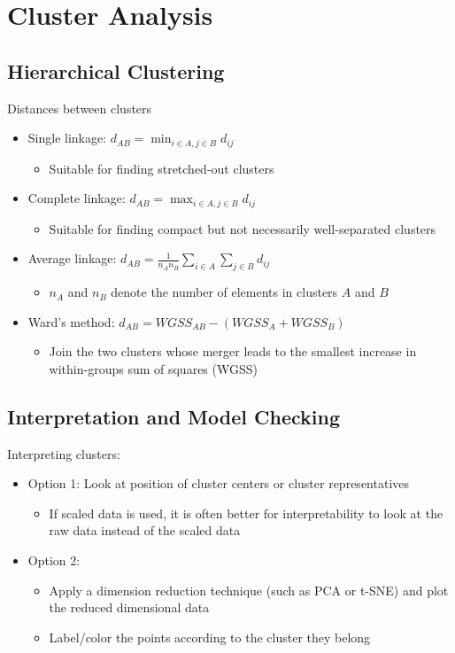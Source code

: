 \documentclass[a4paper]{article}
\begin{document}
\section{Cluster Analysis}

\subsection{Hierarchical Clustering}

Distances between clusters
\begin{itemize}
    \item Single linkage: $d_{AB}=\min_{i\in A, j\in B} d_{ij}$
    \begin{itemize}
        \item Suitable for finding stretched-out clusters
    \end{itemize}
    \item Complete linkage: $d_{AB}=\max_{i\in A, j\in B} d_{ij}$
    \begin{itemize}
        \item Suitable for finding compact but not necessarily well-separated clusters
    \end{itemize}
    \item Average linkage: $d_{AB}=\frac{1}{n_An_B}\sum_{i\in A}\sum_{j\in B}d_{ij}$
    \begin{itemize}
        \item $n_A$ and $n_B$ denote the number of elements in clusters $A$ and $B$
    \end{itemize}
    \item Ward's method: $d_{AB}=WGSS_{AB}-(WGSS_{A}+WGSS_{B})$
    \begin{itemize}
        \item Join the two clusters whose merger leads to the smallest increase in within-groups sum of squares (WGSS)
    \end{itemize}
\end{itemize}

\subsection{Interpretation and Model Checking}

Interpreting clusters:
\begin{itemize}
    \item Option 1: Look at position of cluster centers or cluster representatives
    \begin{itemize}
        \item If scaled data is used, it is often better for interpretability to look at the raw data instead of the scaled data
    \end{itemize}
    \item Option 2: 
    \begin{itemize}
        \item Apply a dimension reduction technique (such as PCA or t-SNE) and plot the reduced dimensional data
        \item Label/color the points according to the cluster they belong
    \end{itemize}
\end{itemize}
\end{document}
